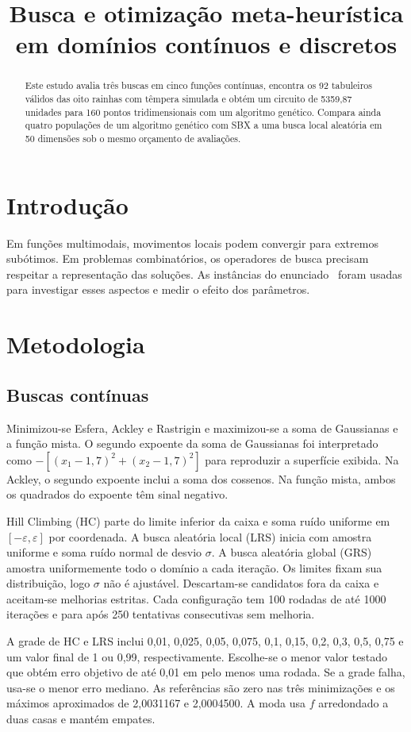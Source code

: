 \documentclass[conference,a4paper]{IEEEtran}
\title{Busca e otimização meta-heurística em domínios contínuos e discretos}
\author{\IEEEauthorblockN{[Nomes dos integrantes]}
\IEEEauthorblockA{Ciências da Computação --- Universidade de Fortaleza\\
Inteligência Artificial --- Trabalho AV3\\
Professor Paulo Cirillo Souza Barbosa}}
\begin{document}
\maketitle
\begin{abstract}
Este estudo avalia três buscas em cinco funções contínuas, encontra os 92 tabuleiros válidos das oito rainhas com têmpera simulada e obtém um circuito de 5359,87 unidades para 160 pontos tridimensionais com um algoritmo genético. Compara ainda quatro populações de um algoritmo genético com SBX a uma busca local aleatória em 50 dimensões sob o mesmo orçamento de avaliações.
\end{abstract}
\section{Introdução}
Em funções multimodais, movimentos locais podem convergir para extremos subótimos. Em problemas combinatórios, os operadores de busca precisam respeitar a representação das soluções. As instâncias do enunciado~\cite{av3} foram usadas para investigar esses aspectos e medir o efeito dos parâmetros.
\section{Metodologia}
\subsection{Buscas contínuas}
Minimizou-se Esfera, Ackley e Rastrigin e maximizou-se a soma de Gaussianas e a função mista. O segundo expoente da soma de Gaussianas foi interpretado como $-[(x_1-1{,}7)^2+(x_2-1{,}7)^2]$ para reproduzir a superfície exibida. Na Ackley, o segundo expoente inclui a soma dos cossenos. Na função mista, ambos os quadrados do expoente têm sinal negativo.

Hill Climbing (HC) parte do limite inferior da caixa e soma ruído uniforme em $[-\varepsilon,\varepsilon]$ por coordenada. A busca aleatória local (LRS) inicia com amostra uniforme e soma ruído normal de desvio $\sigma$. A busca aleatória global (GRS) amostra uniformemente todo o domínio a cada iteração. Os limites fixam sua distribuição, logo $\sigma$ não é ajustável. Descartam-se candidatos fora da caixa e aceitam-se melhorias estritas. Cada configuração tem 100 rodadas de até 1000 iterações e para após 250 tentativas consecutivas sem melhoria.

A grade de HC e LRS inclui 0,01, 0,025, 0,05, 0,075, 0,1, 0,15, 0,2, 0,3, 0,5, 0,75 e um valor final de 1 ou 0,99, respectivamente. Escolhe-se o menor valor testado que obtém erro objetivo de até 0,01 em pelo menos uma rodada. Se a grade falha, usa-se o menor erro mediano. As referências são zero nas três minimizações e os máximos aproximados de 2,0031167 e 2,0004500. A moda usa $f$ arredondado a duas casas e mantém empates.
\end{document}
